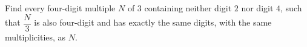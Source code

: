 Find every four-digit multiple $N$ of $3$ containing neither digit $2$ nor digit $4$, such that $\dfrac{N}{3}$ is also four-digit and has exactly the same digits, with the same multiplicities, as $N$.
